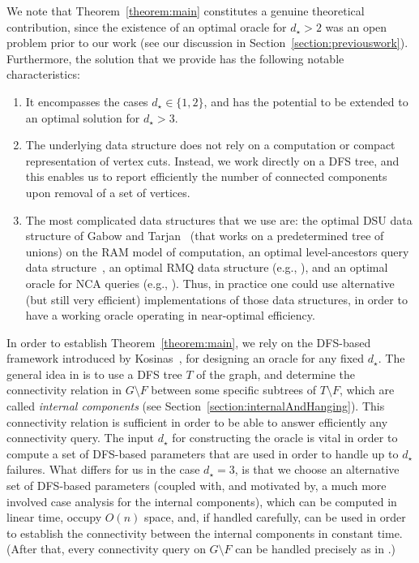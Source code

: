 \documentclass[11pt,a4paper]{article}
\begin{document}
We note that Theorem~\ref{theorem:main} constitutes a genuine theoretical contribution, since the existence of an optimal oracle for $d_{\star}>2$ was an open problem prior to our work (see our discussion in Section~\ref{section:previouswork}). Furthermore, the solution that we provide has the following notable characteristics:

\begin{enumerate}[label={(\arabic*)}]
\item{It encompasses the cases $d_{\star}\in\{1,2\}$, and has the potential to be extended to an optimal solution for $d_{\star}>3$.}
\item{The underlying data structure does not rely on a computation or compact representation of vertex cuts. Instead, we work directly on a DFS tree, and this enables us to report efficiently the number of connected components upon removal of a set of vertices.}
\item{The most complicated data structures that we use are: the optimal DSU data structure of Gabow and Tarjan~\cite{DBLP:journals/jcss/GabowT85} (that works on a predetermined tree of unions) on the RAM model of computation, an optimal level-ancestors query data structure~\cite{DBLP:journals/tcs/BenderF04}, an optimal RMQ data structure (e.g., \cite{DBLP:conf/cpm/FischerH06}), and an optimal oracle for NCA queries (e.g., \cite{DBLP:journals/siamcomp/BuchsbaumGKRTW08}). Thus, in practice one could use alternative (but still very efficient) implementations of those data structures, in order to have a working oracle operating in near-optimal efficiency.}
\end{enumerate}

In order to establish Theorem~\ref{theorem:main}, we rely on the DFS-based framework introduced by Kosinas~\cite{DBLP:conf/esa/Kosinas23}, for designing an oracle for any fixed $d_{\star}$. The general idea in \cite{DBLP:conf/esa/Kosinas23} is to use a DFS tree $T$ of the graph, and determine the connectivity relation in $G\setminus F$ between some specific subtrees of $T\setminus F$, which are called \emph{internal components} (see Section~\ref{section:internalAndHanging}). This connectivity relation is sufficient in order to be able to answer efficiently any connectivity query. The input $d_{\star}$ for constructing the oracle is vital in order to compute a set of DFS-based parameters that are used in order to handle up to $d_{\star}$ failures. What differs for us in the case $d_{\star}=3$, is that we choose an alternative set of DFS-based parameters (coupled with, and motivated by, a much more involved case analysis for the internal components), which can be computed in linear time, occupy $O(n)$ space, and, if handled carefully, can be used in order to establish the connectivity between the internal components in constant time. (After that, every connectivity query on $G\setminus F$ can be handled precisely as in \cite{DBLP:conf/esa/Kosinas23}.) 
\end{document}
